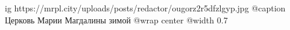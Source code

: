  
 
 
 
 

\ifcmt
  ig https://mrpl.city/uploads/posts/redactor/ougorz2r5dfzlgyp.jpg
	@caption Церковь Марии Магдалины зимой
  @wrap center
  @width 0.7
\fi
